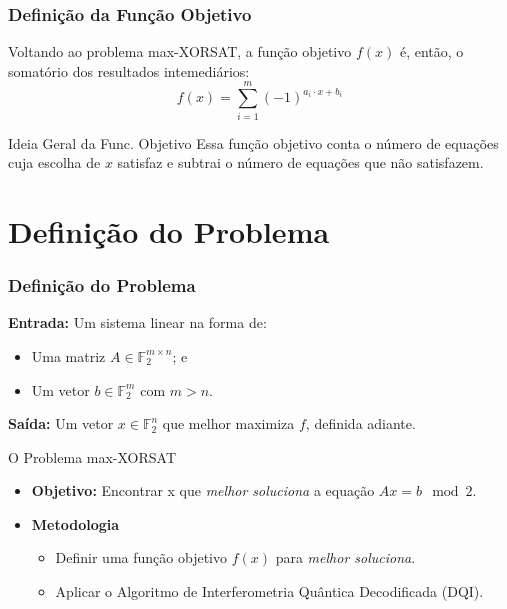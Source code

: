 \documentclass[aspectratio=169]{beamer}
\begin{document}
\begin{frame}
  \frametitle{Definição da Função Objetivo}
  Voltando ao problema max-XORSAT, a função objetivo $f(x)$ é, então, o somatório dos resultados intemediários:
  \[
    f(x)=\sum_{i=1}^m (-1)^{a_i \cdot x + b_i}
  \]

  \vfill
  \begin{block}{Ideia Geral da Func. Objetivo}
    Essa função objetivo conta o número de equações cuja escolha de $x$ satisfaz e subtrai o número de equações que não satisfazem.
  \end{block}
\end{frame}

\section{Definição do Problema}
\begin{frame}
  \frametitle{Definição do Problema}
    \textbf{Entrada:} Um sistema linear na forma de:
    \begin{itemize}
      \item Uma matriz $A \in \mathbb{F}_2^{m \times n}$; e
      \item Um vetor $b \in \mathbb{F}_2^m$ com $m > n$.
    \end{itemize}
    \vfill
    \textbf{Saída:} Um vetor $x \in \mathbb{F}_2^n$ que melhor maximiza $f$, definida adiante.
  \vfill
  \begin{block}{O Problema max-XORSAT}
  \begin{itemize} 
    \item \textbf{Objetivo:} Encontrar x que \textit{melhor soluciona} a equação $Ax=b \mod2$.
    \item \textbf{Metodologia}
    \begin{itemize}
        \item Definir uma função objetivo $f(x)$ para \textit{melhor soluciona}. \checkmark
        \item Aplicar o Algoritmo de Interferometria Quântica Decodificada (DQI).
    \end{itemize}
  \end{itemize}
  \end{block}
\end{frame}
\end{document}
